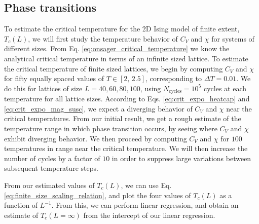 \subsection{Phase transitions}\label{subsec_methods:PT}
To estimate the critical temperature for the 2D Ising model of finite extent, $T_c(L)$, we will first study the temperature behavior of $C_V$ and $\chi$ for systems of different sizes. From Eq. \eqref{eq:onsager_critical_temperature} we know the analytical critical temperature in terms of an infinite sized lattice. To estimate the critical temperature of finite sized lattices, we begin by computing $C_V$ and $\chi$ for fifty equally spaced values of $T\in[2,\,2.5]$, corresponding to $\Delta T = 0.01$. We do this for lattices of size $L=40,60,80,100$, using $N_\mathrm{cycles}=10^5$ cycles at each temperature for all lattice sizes. According to Eqs. \eqref{eq:crit_expo_heatcap} and \eqref{eq:crit_expo_mag_susc}, we expect a diverging behavior of $C_V$ and $\chi$ near the critical temperatures. From our initial result, we get a rough estimate of the temperature range in which phase transition occurs, by seeing where $C_V$ and $\chi$ exhibit diverging behavior. We then proceed by computing $C_V$ and $\chi$ for $100$ temperatures in range near the critical temperature. We will then increase the number of cycles by a factor of $10$ in order to suppress large variations between subsequent temperature steps. 


From our estimated values of $T_c(L)$, we can use Eq. \eqref{eq:finite_size_scaling_relation}, and plot the four values of $T_c(L)$ as a function of $L^{-1}$. From this, we can perform linear regression, and obtain an estimate of $T_c(L=\infty)$ from the intercept of our linear regression. 

